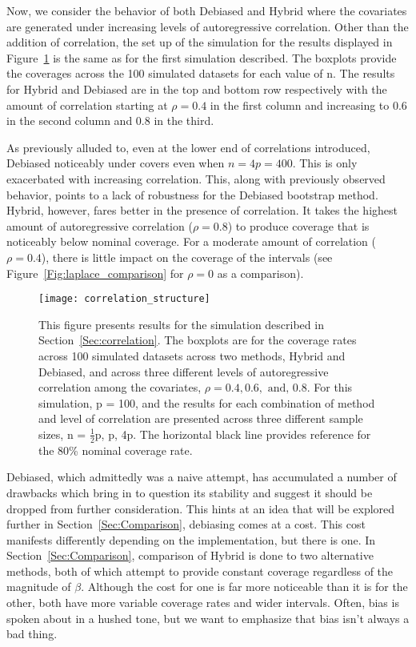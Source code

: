 Now, we consider the behavior of both Debiased and Hybrid where the covariates are generated under increasing levels of autoregressive correlation. Other than the addition of correlation, the set up of the simulation for the results displayed in Figure~\ref{Fig:correlation_structure} is the same as for the first simulation described. The boxplots provide the coverages across the 100 simulated datasets for each value of n. The results for Hybrid and Debiased are in the top and bottom row respectively with the amount of correlation starting at $\rho = 0.4$ in the first column and increasing to $0.6$ in the second column and $0.8$ in the third. 

As previously alluded to, even at the lower end of correlations introduced, Debiased noticeably under covers even when $n = 4p = 400$. This is only exacerbated with increasing correlation. This, along with previously observed behavior, points to a lack of robustness for the Debiased bootstrap method. Hybrid, however, fares better in the presence of correlation. It takes the highest amount of autoregressive correlation ($\rho = 0.8$) to produce coverage that is noticeably below nominal coverage. For a moderate amount of correlation ($\rho = 0.4$), there is little impact on the coverage of the intervals (see Figure~\ref{Fig:laplace_comparison} for $\rho = 0$ as a comparison). 

\begin{figure}[hbtp]
  \begin{center}
  \texttt{[image: correlation\_structure]}
  \caption{\label{Fig:correlation_structure} This figure presents results for the simulation described in Section~\ref{Sec:correlation}. The boxplots are for the coverage rates across 100 simulated datasets across two methods, Hybrid and Debiased, and across three different levels of autoregressive correlation among the covariates, $\rho = 0.4, 0.6, \text{ and, } 0.8$. For this simulation, p = 100, and the results for each combination of method and level of correlation are presented across three different sample sizes, n = $\frac{1}{2}$p, p, 4p. The horizontal black line provides reference for the 80\% nominal coverage rate.}
  \end{center}
\end{figure}

Debiased, which admittedly was a naive attempt, has accumulated a number of drawbacks which bring in to question its stability and suggest it should be dropped from further consideration. This hints at an idea that will be explored further in Section~\ref{Sec:Comparison}, debiasing comes at a cost. This cost manifests differently depending on the implementation, but there is one. In Section~\ref{Sec:Comparison}, comparison of Hybrid is done to two alternative methods, both of which attempt to provide constant coverage regardless of the magnitude of $\beta$. Although the cost for one is far more noticeable than it is for the other, both have more variable coverage rates and wider intervals. Often, bias is spoken about in a hushed tone, but we want to emphasize that bias isn't always a bad thing. 

